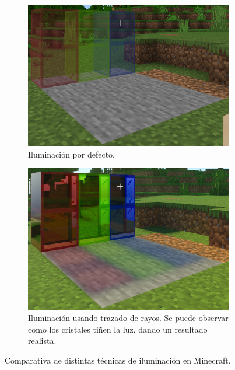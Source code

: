 \documentclass{article}
\begin{document}
\begin{figure}[H]
    \centering 
	\begin{subfigure}[t]{0.48\textwidth}
	    \centering
	    \includegraphics[width=\textwidth]{imagenes/minecraftvanilla.png}
        \caption{Iluminación por defecto.}
    \end{subfigure}
    \hfill
	\begin{subfigure}[t]{0.48\textwidth}
	    \centering
	    \includegraphics[width=\textwidth]{imagenes/minecraftrt.png}
        \caption{Iluminación usando trazado de rayos. Se puede observar como los cristales tiñen la luz, dando un resultado realista.}
    \end{subfigure}   
    \caption{Comparativa de distintas técnicas de iluminación en Minecraft.} 
\end{figure}
\end{document}
